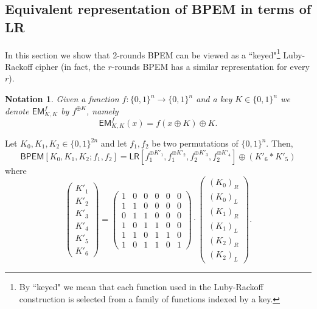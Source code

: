 \documentclass{llncs}
\newcommand{\s}{\{0,1\}}
\newcommand{\tx}{\textsf}
\newtheorem{notat}{Notation}
\begin{document}
\subsection{Equivalent representation of BPEM in terms of LR}\label{sec:BPEM_LR}
In this section we show that 2-rounds BPEM can be viewed as a ``keyed"\footnote{By ``keyed" we mean that each function used in the Luby-Rackoff construction is selected from a family of functions indexed by a key.} Luby-Rackoff cipher (in fact, the $r$-rounds BPEM has a similar representation for every $r$).
\begin{notat}\label{notat:f_oplus_K}
Given a function $f: \s^n \to \s^n$ and a key $K\in\s^n$ we denote $\tx{EM}^{f}_{K,K}$ by $f^{\oplus K}$, namely
$$\tx{EM}^{f}_{K,K}(x)=f(x\oplus K)\oplus K.$$
\end{notat}
\begin{lemma}\label{lem:BPEM=LR}
Let $K_0, K_1, K_2 \in \s^{2n}$ and let $f_1, f_2$ be two permutations of $\{0,1 \}^n$. Then,
\begin{equation*}\label{eq:BPEM=LR}
\tx{BPEM}[K_0, K_1, K_2;f_1,f_2] = \tx{LR}[f_1^{\oplus K'_1}, f_1^{\oplus K'_2}, f_2^{\oplus K'_3}, f_2^{\oplus K'_4}] \oplus (K'_6 * K'_5)
\end{equation*}
where
\begin{equation}\label{matrix1}
\begin{pmatrix}
K'_{1} \\
K'_{2} \\
K'_{3} \\
K'_{4} \\
K'_{5} \\
K'_{6}
\end{pmatrix}
= \begin{pmatrix}
1 & 0 & 0 & 0 & 0 & 0\\
1 & 1 & 0 & 0 & 0 & 0 \\
0 & 1 & 1 & 0 & 0 & 0 \\
1 & 0 & 1 & 1 & 0 & 0 \\
1 & 1 & 0 & 1 & 1 & 0 \\
1 & 0 & 1 & 1 & 0 & 1
\end{pmatrix}
\cdot
\begin{pmatrix}
(K_0)_R \\
(K_0)_L \\
(K_1)_R \\
(K_1)_L\\
(K_2)_R \\
(K_2)_L
\end{pmatrix}
.
\end{equation}
\end{lemma}
\end{document}
